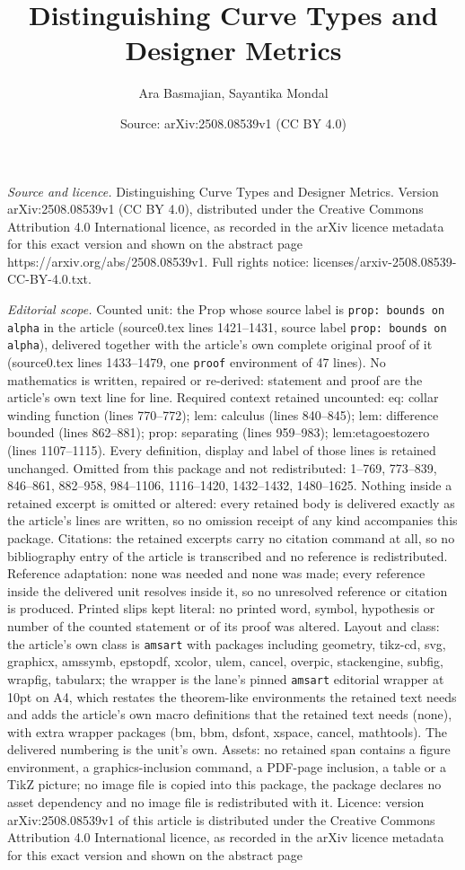 \documentclass[10pt,a4paper]{amsart}
\title[Distinguishing Curve Types and Designer Metrics]{Distinguishing Curve Types and Designer Metrics}
\author{Ara Basmajian, Sayantika Mondal}
\date{Source: arXiv:2508.08539v1 (CC BY 4.0)}
\begin{document}
\maketitle

\noindent\emph{Source and licence.} Distinguishing Curve Types and Designer Metrics. Version arXiv:2508.08539v1 (CC BY 4.0), distributed under the Creative Commons Attribution 4.0 International licence, as recorded in the arXiv licence metadata for this exact version and shown on the abstract page https://arxiv.org/abs/2508.08539v1. Full rights notice: licenses/arxiv-2508.08539-CC-BY-4.0.txt.\par\smallskip

\noindent\textit{Editorial scope.} Counted unit: the Prop whose source label is \texttt{prop: bounds on alpha} in the article (source0.tex lines 1421--1431, source label \texttt{prop: bounds on alpha}), delivered together with the article's own complete original proof of it (source0.tex lines 1433--1479, one \texttt{proof} environment of 47 lines). No mathematics is written, repaired or re-derived: statement and proof are the article's own text line for line. Required context retained uncounted: eq: collar winding function (lines 770--772); lem: calculus (lines 840--845); lem: difference bounded (lines 862--881); prop: separating (lines 959--983); lem:etagoestozero (lines 1107--1115). Every definition, display and label of those lines is retained unchanged. Omitted from this package and not redistributed: 1--769, 773--839, 846--861, 882--958, 984--1106, 1116--1420, 1432--1432, 1480--1625. Nothing inside a retained excerpt is omitted or altered: every retained body is delivered exactly as the article's lines are written, so no omission receipt of any kind accompanies this package. Citations: the retained excerpts carry no citation command at all, so no bibliography entry of the article is transcribed and no reference is redistributed. Reference adaptation: none was needed and none was made; every reference inside the delivered unit resolves inside it, so no unresolved reference or citation is produced. Printed slips kept literal: no printed word, symbol, hypothesis or number of the counted statement or of its proof was altered. Layout and class: the article's own class is \texttt{amsart} with packages including geometry, tikz-cd, svg, graphicx, amssymb, epstopdf, xcolor, ulem, cancel, overpic, stackengine, subfig, wrapfig, tabularx; the wrapper is the lane's pinned \texttt{amsart} editorial wrapper at 10pt on A4, which restates the theorem-like environments the retained text needs and adds the article's own macro definitions that the retained text needs (none), with extra wrapper packages (bm, bbm, dsfont, xspace, cancel, mathtools). The delivered numbering is the unit's own. Assets: no retained span contains a figure environment, a graphics-inclusion command, a PDF-page inclusion, a table or a TikZ picture; no image file is copied into this package, the package declares no asset dependency and no image file is redistributed with it. Licence: version arXiv:2508.08539v1 of this article is distributed under the Creative Commons Attribution 4.0 International licence, as recorded in the arXiv licence metadata for this exact version and shown on the abstract page 
\end{document}

